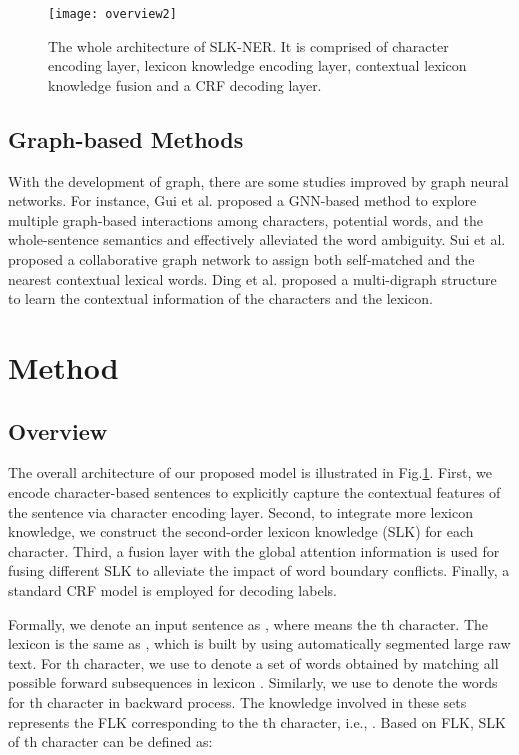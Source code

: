 \documentclass[conference]{IEEEtran}
\begin{document}
\begin{figure}[t]
    \centerline{\texttt{[image: overview2]}}
    \caption{The whole architecture of SLK-NER. 
It is comprised of character encoding layer, lexicon knowledge encoding layer, 
contextual lexicon knowledge fusion and a CRF decoding layer.
} \label{overview}
    \end{figure}


\subsection{Graph-based Methods}
With the development of graph, there are some studies improved by graph neural networks.
For instance, Gui et al. \cite{gui2019lexicon} proposed a GNN-based method to explore multiple graph-based interactions among characters, potential words,
and the whole-sentence semantics and effectively alleviated the word ambiguity.
Sui et al. \cite{sui2019leverage} proposed a collaborative graph network to assign both self-matched and the nearest contextual lexical words. 
Ding et al. \cite{ding2019neural} proposed a multi-digraph structure to learn the contextual information
of the characters and the lexicon.








\section{Method}


\subsection{Overview}


The overall architecture of our proposed model is illustrated in Fig.\ref{overview}.
First, we encode character-based sentences to explicitly capture the contextual features of the sentence via character encoding layer.
Second, to integrate more lexicon knowledge, we construct the second-order lexicon knowledge (SLK) for each character.
Third, a fusion layer with the global attention information is used for fusing different SLK 
to alleviate the impact of word boundary conflicts.
Finally, a standard CRF model \cite{lafferty2001conditional} is 
employed for decoding labels. 

Formally, we denote an input sentence as ,
where  means the th character. The lexicon  is the same as \cite{zhang2018chinese}, which is built by 
using automatically segmented large raw text.
For th character, we use  to denote a set of words obtained by 
matching all possible forward subsequences in lexicon  \cite{liu2019encoding}.  Similarly, we use  to denote the words 
for th character in backward process.
The knowledge involved in these sets represents the FLK corresponding to the th character,
i.e., .
Based on FLK, SLK of th character can be defined as:
\end{document}
